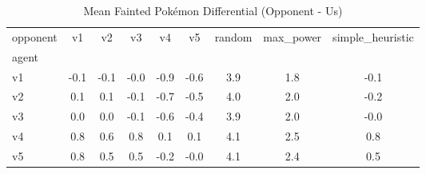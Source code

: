 \begin{table}[htbp]
\caption{Mean Fainted Pokémon Differential (Opponent - Us)}
\label{tab:doubles_fainted_diff}
\begin{tabular}{lcccccccc}
\hline
opponent & v1 & v2 & v3 & v4 & v5 & random & max_power & simple_heuristic \\
agent &  &  &  &  &  &  &  &  \\
\hline
v1 & -0.1 & -0.1 & -0.0 & -0.9 & -0.6 & 3.9 & 1.8 & -0.1 \\
v2 & 0.1 & 0.1 & -0.1 & -0.7 & -0.5 & 4.0 & 2.0 & -0.2 \\
v3 & 0.0 & 0.0 & -0.1 & -0.6 & -0.4 & 3.9 & 2.0 & -0.0 \\
v4 & 0.8 & 0.6 & 0.8 & 0.1 & 0.1 & 4.1 & 2.5 & 0.8 \\
v5 & 0.8 & 0.5 & 0.5 & -0.2 & -0.0 & 4.1 & 2.4 & 0.5 \\
\hline
\end{tabular}
\end{table}
